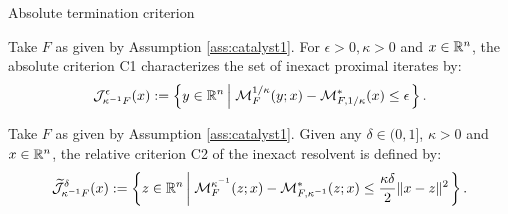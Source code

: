 \documentclass[11pt]{beamer}
\theoremstyle{definition}
\begin{document}
        \begin{frame}{Absolute termination criterion}
            \begin{definition}\label{def:catalyst-termination-c1}
                Take $F$ as given by Assumption \ref{ass:catalyst1}.
                For $\epsilon > 0, \kappa > 0$ and $x \in \mathbb R^n$, the absolute criterion C1 characterizes the set of inexact proximal iterates by: 
                \begin{align*}
                    \mathcal J_{\kappa^{-1} F}^\epsilon (x) := 
                    \left\lbrace
                        y \in \mathbb R^n \left | \; 
                                \mathcal M^{1/\kappa}_F (y; x) - 
                                \mathcal M^*_{F, 1/\kappa}(x) \le \epsilon
                        \right.
                    \right\rbrace. 
                \end{align*}
            \end{definition}
            \begin{definition}\label{def:catalyst-termination-c2}
                Take $F$ as given by Assumption \ref{ass:catalyst1}. 
                Given any $\delta \in (0, 1]$, $\kappa > 0$ and $x \in \mathbb R^n$, the relative criterion C2 of the inexact resolvent is defined by: 
                {\small
                \begin{align*}
                    \widetilde{\mathcal J}_{\kappa^{-1}F}^\delta (x)
                    := 
                    \left\lbrace
                        z \in \mathbb R^n \left| \;
                            \mathcal M_F^{\kappa^{-1}}(z; x) - 
                            \mathcal M^*_{F, \kappa^{-1}}(z; x)
                            \le \frac{\kappa\delta}{2}\Vert x - z\Vert^2
                        \right.
                    \right\rbrace. 
                \end{align*}
                }
            \end{definition}
        \end{frame}
\end{document}
